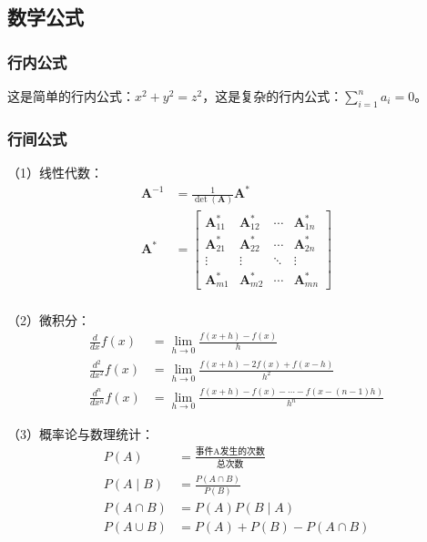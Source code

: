\begin{ujnbody}
    \subsection{数学公式}
    \subsubsection{行内公式}
    这是简单的行内公式：$x^2+y^2=z^2$，这是复杂的行内公式：$\sum_{i=1}^n a_i=0$。
    \subsubsection{行间公式}
    （1）线性代数：
    \begin{equation}
        \begin{split}
            \mathbf{A}^{-1} &= \frac{1}{\det(\mathbf{A})}\mathbf{A}^* \\
            \mathbf{A}^* &= \begin{bmatrix}
                \mathbf{A}_{11}^* & \mathbf{A}_{12}^* & \cdots & \mathbf{A}_{1n}^* \\
                \mathbf{A}_{21}^* & \mathbf{A}_{22}^* & \cdots & \mathbf{A}_{2n}^* \\
                \vdots & \vdots & \ddots & \vdots \\
                \mathbf{A}_{m1}^* & \mathbf{A}_{m2}^* & \cdots & \mathbf{A}_{mn}^*
            \end{bmatrix} \\
        \end{split}
    \end{equation}

    （2）微积分：
    \begin{equation}
        \begin{split}
            \frac{d}{dx}f(x) &= \lim_{h \to 0}\frac{f(x+h)-f(x)}{h} \\
            \frac{d^2}{dx^2}f(x) &= \lim_{h \to 0}\frac{f(x+h)-2f(x)+f(x-h)}{h^2} \\
            \frac{d^n}{dx^n}f(x) &= \lim_{h \to 0}\frac{f(x+h)-f(x)-\cdots-f(x-(n-1)h)}{h^n}
        \end{split}
        \label{eq:2}
    \end{equation}

    （3）概率论与数理统计：
    \begin{equation}
        \begin{split}
            P(A) &= \frac{\text{事件A发生的次数}}{\text{总次数}} \\
            P(A \mid B) &= \frac{P(A \cap B)}{P(B)} \\
            P(A \cap B) &= P(A)P(B \mid A) \\
            P(A \cup B) &= P(A) + P(B) - P(A \cap B)
        \end{split}
    \end{equation}


\end{ujnbody}
